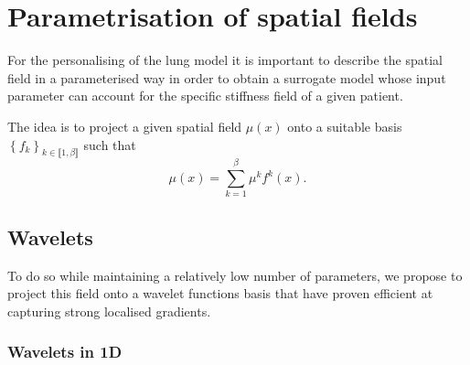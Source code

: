 \section{Parametrisation of spatial fields}

For the personalising of the lung model it is important to describe the spatial field in a parameterised way in order to obtain a surrogate model whose input parameter can account for the specific stiffness field of a given patient.

The idea is to project a given spatial field $\mu\left(x\right)$ onto a suitable basis $\left\{f_k\right\}_{k \in \llbracket 1, \beta \rrbracket}$ such that 
\begin{equation}
    \mu\left(x\right) = \sum\limits_{k=1}^{\beta}\mu^{k}f^k\left(x\right).
\end{equation}

\subsection{Wavelets}

To do so while maintaining a relatively low number of parameters, we propose to project this field onto a wavelet functions basis that have proven efficient at capturing strong localised gradients.


\subsubsection{Wavelets in 1D}

